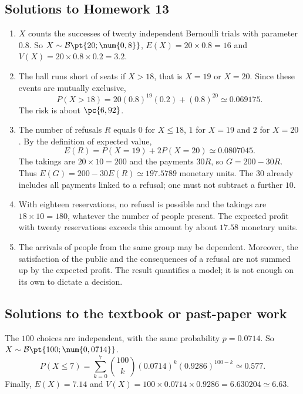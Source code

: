 \subsection{Solutions to Homework 13}\begin{enumerate}
\item $X$ counts the successes of twenty independent Bernoulli trials with parameter $\num{0,8}$. So $X\sim\mathcal B\pt{20;\num{0,8}}$, $E(X)=20\times\num{0,8}=16$ and $V(X)=20\times\num{0,8}\times\num{0,2}=\num{3,2}$.
\item The hall runs short of seats if $X>18$, that is $X=19$ or $X=20$. Since these events are mutually exclusive,
\[P(X>18)=20(\num{0,8})^{19}(\num{0,2})+(\num{0,8})^{20}\simeq\num{0,069175}.\]
The risk is about $\pc{6,92}$.
\item The number of refusals $R$ equals $0$ for $X\le18$, $1$ for $X=19$ and $2$ for $X=20$. By the definition of expected value,
\[E(R)=P(X=19)+2P(X=20)\simeq\num{0,0807045}.\]
The takings are $20\times10=200$ and the payments $30R$, so $G=200-30R$. Thus $E(G)=200-30E(R)\simeq\num{197,5789}$ monetary units. The $30$ already includes all payments linked to a refusal; one must not subtract a further $10$.
\item With eighteen reservations, no refusal is possible and the takings are $18\times10=180$, whatever the number of people present. The expected profit with twenty reservations exceeds this amount by about $\num{17,58}$ monetary units.
\item The arrivals of people from the same group may be dependent. Moreover, the satisfaction of the public and the consequences of a refusal are not summed up by the expected profit. The result quantifies a model; it is not enough on its own to dictate a decision.
\end{enumerate}

\subsection{Solutions to the textbook or past-paper work}The $100$ choices are independent, with the same probability $p=\num{0,0714}$. So $X\sim\mathcal B\pt{100;\num{0,0714}}$.
\[P(X\le7)=\sum_{k=0}^7\binom{100}k(\num{0,0714})^k(\num{0,9286})^{100-k}\simeq\num{0,577}.\]
Finally, $E(X)=\num{7,14}$ and $V(X)=100\times\num{0,0714}\times\num{0,9286}=\num{6,630204}\simeq\num{6,63}$.

\fi

